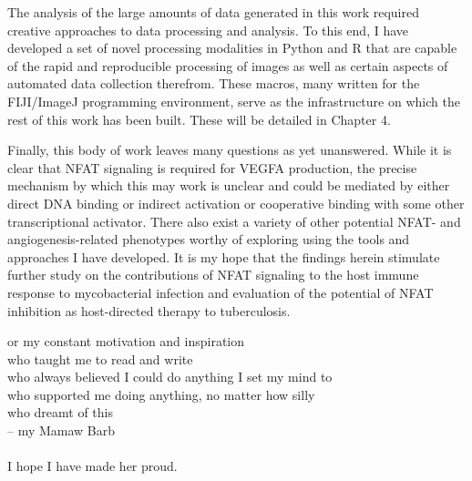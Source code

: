 \documentclass[PhD]{dukethesis2006}
\begin{document}
The analysis of the large amounts of data generated in this work required creative approaches to data processing and analysis. To this end, I have developed a set of novel processing modalities in Python and R that are capable of the rapid and reproducible processing of images as well as certain aspects of automated data collection therefrom. These macros, many written for the FIJI/ImageJ programming environment, serve as the infrastructure on which the rest of this work has been built. These will be detailed in Chapter 4.

Finally, this body of work leaves many questions as yet unanswered. While it is clear that NFAT signaling is required for VEGFA production, the precise mechanism by which this may work is unclear and could be mediated by either direct DNA binding or indirect activation or cooperative binding with some other transcriptional activator. There also exist a variety of other potential NFAT- and angiogenesis-related phenotypes worthy of exploring using the tools and approaches  I have developed. It is my hope that the findings herein stimulate further study on the contributions of NFAT signaling to the host immune response to mycobacterial infection and evaluation of the potential of NFAT inhibition as host-directed therapy to tuberculosis.

\dedication

For my constant motivation and inspiration \\
who taught me to read and write \\
who always believed I could do anything I set my mind to \\
who supported me doing anything, no matter how silly \\
who dreamt of this \\
\quad -- my Mamaw Barb \\
\\
I hope I have made her proud.



\listoftables

\listoffigures

\acknowledgements
\end{document}
